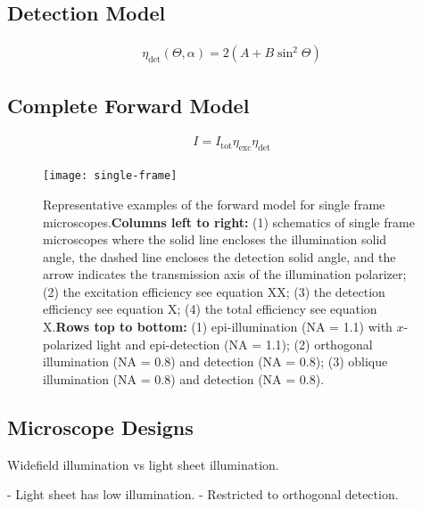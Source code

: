 \documentclass[10pt]{article}
\begin{document}
\subsection{Detection Model}
\begin{align}
  \eta_{\text{det}}(\Theta, \alpha) = 2(A + B\sin^2\Theta)
\end{align}



\subsection{Complete Forward Model}
\begin{align}
  I = I_{\text{tot}}\eta_{\text{exc}}\eta_{\text{det}}
\end{align}

\begin{figure}[htbp]
\centering\texttt{[image: single-frame]}
\caption{Representative examples of the forward model for single frame
  microscopes.\newline \newline \textbf{Columns left to right:} (1) schematics of
  single frame microscopes where the solid line encloses the illumination
  solid angle, the dashed line encloses the detection solid angle, and the arrow
  indicates the transmission axis of the illumination polarizer; (2) the excitation
  efficiency see equation XX; (3) the detection efficiency see equation X; (4)
  the total efficiency see equation X.\newline \newline \textbf{Rows top to
    bottom:} (1) epi-illumination (NA = 1.1) with $x$-polarized light and
  epi-detection (NA = 1.1); (2) orthogonal illumination (NA = 0.8) and detection
  (NA = 0.8); (3) oblique illumination (NA = 0.8) and detection (NA = 0.8).}
\end{figure}

\subsection{Microscope Designs}
Widefield illumination vs light sheet illumination.

- Light sheet has low illumination. 
- Restricted to orthogonal detection. 
\end{document}

